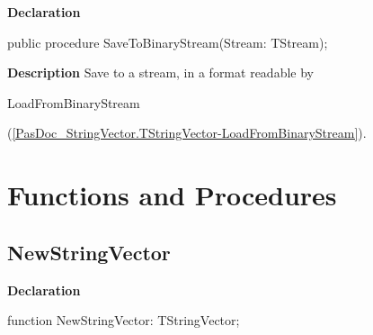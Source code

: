 \documentclass{report}
\newif\ifpdf
\begin{document}
\label{PasDoc_StringVector.TStringVector-SaveToBinaryStream}
\begin{list}{}{
\setlength{\itemindent}{0cm}
\setlength{\listparindent}{0cm}
\setlength{\leftmargin}{\evensidemargin}
\addtolength{\leftmargin}{\tmplength}
\settowidth{\labelsep}{X}
\addtolength{\leftmargin}{\labelsep}
\setlength{\labelwidth}{\tmplength}
}
\item[\textbf{Declaration}\hfill]
\ifpdf
\begin{flushleft}
\fi
\begin{ttfamily}
public procedure SaveToBinaryStream(Stream: TStream);\end{ttfamily}

\ifpdf
\end{flushleft}
\fi

\par
\item[\textbf{Description}]
Save to a stream, in a format readable by \begin{ttfamily}LoadFromBinaryStream\end{ttfamily}(\ref{PasDoc_StringVector.TStringVector-LoadFromBinaryStream}).

\end{list}
\section{Functions and Procedures}
\ifpdf
\subsection*{\large{\textbf{NewStringVector}}\normalsize\hspace{1ex}\hrulefill}
\else
\subsection*{NewStringVector}
\fi
\label{PasDoc_StringVector-NewStringVector}
\begin{list}{}{
\setlength{\itemindent}{0cm}
\setlength{\listparindent}{0cm}
\setlength{\leftmargin}{\evensidemargin}
\addtolength{\leftmargin}{\tmplength}
\settowidth{\labelsep}{X}
\addtolength{\leftmargin}{\labelsep}
\setlength{\labelwidth}{\tmplength}
}
\item[\textbf{Declaration}\hfill]
\ifpdf
\begin{flushleft}
\fi
\begin{ttfamily}
function NewStringVector: TStringVector;\end{ttfamily}

\ifpdf
\end{flushleft}
\fi

\end{list}
\ifpdf
\end{document}
